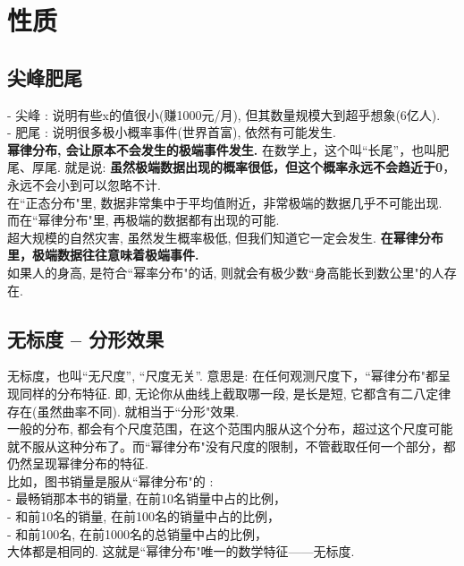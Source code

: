 \documentclass[UTF8]{ctexart}
\begin{document}
	
	
	
	\section{性质}
	
	\subsection{尖峰肥尾} 
	
	- 尖峰 : 说明有些x的值很小(赚1000元/月), 但其数量规模大到超乎想象(6亿人). \\
	- 肥尾 : 说明很多极小概率事件(世界首富), 依然有可能发生. \\
	
	\textbf{幂律分布, 会让原本不会发生的极端事件发生.} 在数学上，这个叫``长尾”，也叫肥尾、厚尾. 就是说: \textbf{虽然极端数据出现的概率很低，但这个概率永远不会趋近于0}，永远不会小到可以忽略不计.  \\
	
	在``正态分布"里, 数据非常集中于平均值附近，非常极端的数据几乎不可能出现. 而在``幂律分布"里, 再极端的数据都有出现的可能. \\	
	超大规模的自然灾害, 虽然发生概率极低, 但我们知道它一定会发生. \textbf{在幂律分布里，极端数据往往意味着极端事件.} \\
	
	
	如果人的身高, 是符合``幂率分布"的话, 则就会有极少数``身高能长到数公里"的人存在. 
	
	
	
	\subsection{无标度 -- 分形效果}
	
	无标度，也叫``无尺度”, ``尺度无关”. 意思是: 在任何观测尺度下，``幂律分布"都呈现同样的分布特征. 即, 无论你从曲线上截取哪一段, 是长是短, 它都含有二八定律存在(虽然曲率不同). 就相当于``分形"效果. \\	
	一般的分布, 都会有个尺度范围，在这个范围内服从这个分布，超过这个尺度可能就不服从这种分布了。而``幂律分布"没有尺度的限制，不管截取任何一个部分，都仍然呈现幂律分布的特征. \\
	
	比如，图书销量是服从``幂律分布"的 : \\
	- 最畅销那本书的销量, 在前10名销量中占的比例， \\
	- 和前10名的销量, 在前100名的销量中占的比例， \\
	- 和前100名, 在前1000名的总销量中占的比例，\\
	大体都是相同的. 这就是``幂律分布"唯一的数学特征——无标度.
	
\end{document}
